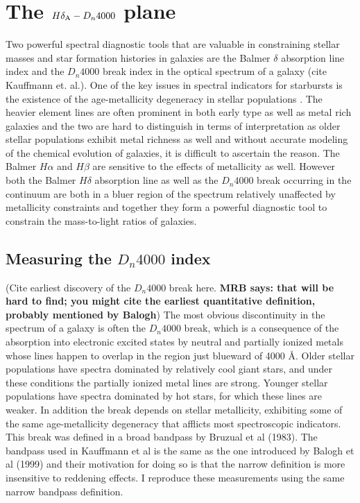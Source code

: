 \section{The $H\delta_{\rm A}-D_{n}4000$ plane}

Two powerful spectral diagnostic tools that are valuable in constraining stellar masses and star formation histories in galaxies are the Balmer $\delta$ absorption line index and the $D_{n}4000$ break index in the optical spectrum of a galaxy (cite Kauffmann et. al.). One of the key issues in spectral indicators for starbursts is the existence of the age-metallicity degeneracy in stellar populations \citep{worthey_comprehensive_1994}. The heavier element lines are often prominent in both early type as well as metal rich galaxies and the two are hard to distinguish in terms of interpretation as older stellar populations exhibit metal richness as well and without accurate modeling of the chemical evolution of galaxies, it is difficult to ascertain the reason. The Balmer $H\alpha$ and $H\beta$ are sensitive to the effects of metallicity as well. However both the Balmer $H\delta$ absorption line as well as the $D_{n}4000$ break occurring in the continuum are both in a bluer region of the spectrum relatively unaffected by metallicity constraints and together they form a powerful diagnostic tool to constrain the mass-to-light ratios of galaxies. 

\subsection{Measuring the $D_{n}4000$ index}

(Cite earliest discovery of the $D_{n}4000$ break here. {\bf MRB says: that will be hard to find; you might cite the earliest quantitative definition, probably mentioned by Balogh})  The most obvious discontinuity in the spectrum of a galaxy is often the $D_{n}4000$ break, which is a consequence of the absorption into electronic excited states by neutral and partially ionized metals whose lines happen to overlap in the region just blueward of 4000 \AA.  Older stellar populations have spectra dominated by relatively cool giant stars, and under these conditions the partially ionized metal lines are strong. Younger stellar populations have spectra dominated by hot stars, for which these lines are weaker. In addition the break
depends on stellar metallicity, exhibiting some of the same age-metallicity degeneracy that afflicts most spectroscopic indicators. This break was defined in a broad bandpass by Bruzual et al (1983). The bandpass used in Kauffmann et al is the same as the one introduced by Balogh et al (1999) and their motivation for doing so is that the narrow definition is more insensitive to reddening effects. I reproduce these measurements using the same narrow bandpass definition.


